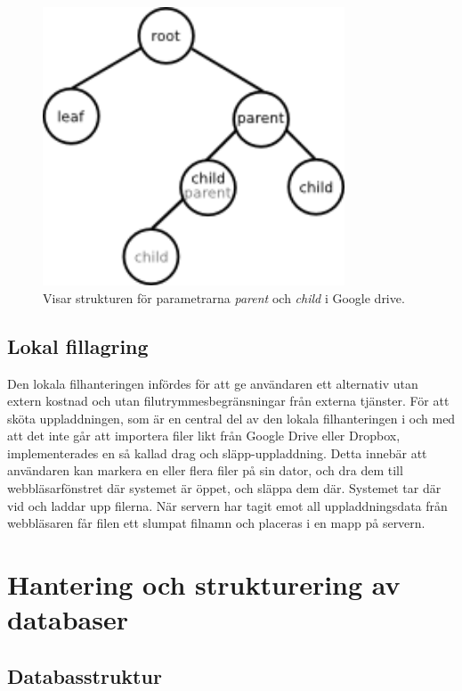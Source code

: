 \documentclass[a4paper,12pt,oneside,final]{extbook}
\begin{document}
\begin{figure}[!H]
\centering
\includegraphics[width=0.8\textwidth]{parentchild.png}
\caption{Visar strukturen för parametrarna \textit{parent} och \textit{child} i Google drive.}
\label{fig:parentchild}
\end{figure}

\subsection{Lokal fillagring}
Den lokala filhanteringen infördes för att ge användaren ett alternativ utan extern kostnad och utan filutrymmesbegränsningar från externa tjänster. För att sköta uppladdningen, som är en central del av den lokala filhanteringen i och med att det inte går att importera filer likt från Google Drive eller Dropbox, implementerades en så kallad drag och släpp-uppladdning. Detta innebär att användaren kan markera en eller flera filer på sin dator, och dra dem till webbläsarfönstret där systemet är öppet, och släppa dem där. Systemet tar där vid och laddar upp filerna. När servern har tagit emot all uppladdningsdata från webbläsaren får filen ett slumpat filnamn och placeras i en mapp på servern.

\section{Hantering och strukturering av databaser}

\subsection{Databasstruktur}
\label{ssec:activerec}
\end{document}
